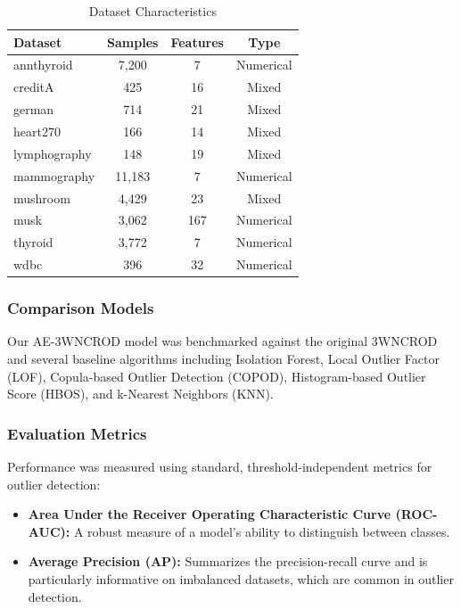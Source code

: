\documentclass[12pt,a4paper]{article}
\begin{document}
\begin{table}[h]
\centering
\caption{Dataset Characteristics}
\label{tab:datasets}
\begin{tabular}{lccc}
\toprule
\textbf{Dataset} & \textbf{Samples} & \textbf{Features} & \textbf{Type} \\
\midrule
annthyroid & 7,200 & 7 & Numerical \\
creditA & 425 & 16 & Mixed \\
german & 714 & 21 & Mixed \\
heart270 & 166 & 14 & Mixed \\
lymphography & 148 & 19 & Mixed \\
mammography & 11,183 & 7 & Numerical \\
mushroom & 4,429 & 23 & Mixed \\
musk & 3,062 & 167 & Numerical \\
thyroid & 3,772 & 7 & Numerical \\
wdbc & 396 & 32 & Numerical \\
\bottomrule
\end{tabular}
\end{table}

\subsubsection{Comparison Models}

Our AE-3WNCROD model was benchmarked against the original 3WNCROD \cite{zhang2024} and several baseline algorithms including Isolation Forest, Local Outlier Factor (LOF), Copula-based Outlier Detection (COPOD), Histogram-based Outlier Score (HBOS), and k-Nearest Neighbors (KNN).

\subsubsection{Evaluation Metrics}

Performance was measured using standard, threshold-independent metrics for outlier detection:

\begin{itemize}
\item \textbf{Area Under the Receiver Operating Characteristic Curve (ROC-AUC):} A robust measure of a model's ability to distinguish between classes.
\item \textbf{Average Precision (AP):} Summarizes the precision-recall curve and is particularly informative on imbalanced datasets, which are common in outlier detection.
\end{itemize}
\end{document}
